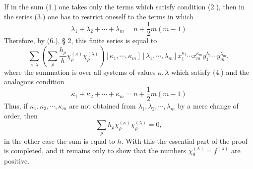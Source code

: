 \documentclass[11pt]{article}
\begin{document}
If in the sum (1.) one takes only the terms which satisfy condition (2.), then in the series (3.) one has to restrict oneself to the terms in which
\begin{equation}\tag{4.}
 \lambda_1+\lambda_2+\cdots+\lambda_m=n+\frac12m(m-1)
\end{equation}
Therefore, by (6.), § 2, this finite series is equal to
\[
 \sum_{\kappa,\lambda}\left(\sum_\rho\frac{h_\rho}{h}\chi_\rho^{(\kappa)}\chi_\rho^{(\lambda)}\right)
 [\kappa_1,\cdots,
\kappa_m][\lambda_1,\cdots,
\lambda_m]x_1^{\kappa_1}\cdots x_m^{\kappa_m}y_1^{\lambda_1}\cdots y_m^{\lambda_m},
\]
where the summation is over all systems of values $\kappa,\lambda$ which satisfy (4.) and the analogous condition
\[
 \kappa_1+\kappa_2+\cdots+\kappa_m=n+\frac12m(m-1)
\]
Thus, if $\kappa_1,\kappa_2,\cdots,\kappa_m$ are not obtained from $\lambda_1,\lambda_2,\cdots,\lambda_m$ by a mere change of order, then
\[
 \sum_\rho h_\rho\chi_\rho^{(\kappa)}\chi_\rho^{(\lambda)}=0,
\]
in the other case the sum is equal to $h$. With this the essential part of the proof is completed, and it remains only to show that the numbers $\chi_0^{(\lambda)}=f^{(\lambda)}$ are positive.
\end{document}
